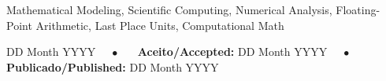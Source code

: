 \documentclass[portuguese]{sbc2025}%
\begin{document}
\begin{frontmatter}
\begin{keywords}
Mathematical Modeling, Scientific Computing, Numerical Analysis, Floating-Point Arithmetic, Last Place Units, Computational Math
\end{keywords}

\begin{dates}
 DD Month YYYY~~~$\bullet$~~~
{\sffamily\textbf{Aceito/Accepted:}} DD Month YYYY~~~$\bullet$~~~
{\sffamily\textbf{Publicado/Published:}} DD Month YYYY
\end{dates}



\end{frontmatter}
 











\end{document}
